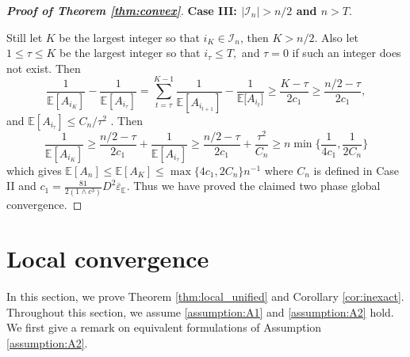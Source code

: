 \documentclass[11pt]{amsart}
\theoremstyle{plain}
\theoremstyle{definition}
\theoremstyle{remark}
\def\E{\mathbb{E}}
\def\eps{\varepsilon}
\def\param{\boldsymbol{\theta}}
\DeclareMathOperator*{\argmin}{arg\,min}
\newcommand{\commHL}[1]{{\textcolor{blue}{#1}}}
\begin{document}
\begin{proof}[\textbf{Proof of Theorem \ref{thm:convex}}]
     \textbf{Case III: $|\mathcal{I}_n|>n/2$ and $n> T$}. 
    
     Still let $K$ be the largest integer so that $i_{K}\in \mathcal{I}_n$, then $K>n/2.$ Also let $1\leq \tau\leq K$ be the largest integer so that $i_{\tau}\leq T,$ and $\tau=0$ if such an integer does not exist.
     Then
    \[
    \frac{1}{\E[A_{i_K}]}-\frac{1}{\E[A_{i_{\tau}}]}=\sum_{t=\tau}^{K-1}\frac{1}{{\E[A_{i_{t+1}}]}}-\frac{1}{{\E[A_{i_{t}}}]}\geq \frac{K-\tau}{2c_1}\geq \frac{n/2-\tau}{2c_1},
    \]
    and $\E[A_{i_{\tau}}]\le C_n/\tau^{2}$ .
    Then
    \[
    \frac{1}{\E[A_{i_K}]}\geq \frac{n/2-\tau}{2c_1}+\frac{1}{\E[A_{i_{\tau}}]}\geq \frac{n/2-\tau}{2c_1}+\frac{\tau^2}{C_n}\geq n\min \{\frac{1}{4c_1},\frac{1}{2C_n}\}
    \]
    which gives $\E[A_n]\leq \E[A_K]\le \max\{4c_1,2C_n\}n^{-1}$ where $C_n$ is defined in Case II and $c_1=\frac{81}{2(1\wedge c^3)}D^2\overline{\eps}_{\E}.$ Thus we have proved the claimed two phase global convergence.
\end{proof}

\section{Local convergence}
\label{sec:local_pf}
In this section, we prove Theorem \ref{thm:local_unified} and Corollary  \ref{cor:inexact}.
Throughout this section, we assume \ref{assumption:A1} and \ref{assumption:A2} hold.
We first give a remark on equivalent formulations of Assumption \ref{assumption:A2}. %
\end{document}
